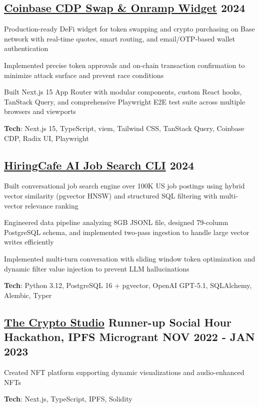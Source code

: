 \documentclass[letter,10pt]{article}
\begin{document}
\subsection{{ \href{https://github.com/Suhel-Kap/coinbase-swap-widget}{Coinbase CDP Swap \& Onramp Widget} \hfill 2024}}
\begin{zitemize}
  \item Production-ready DeFi widget for token swapping and crypto purchasing on Base network with real-time quotes, smart routing, and email/OTP-based wallet authentication
  \item Implemented precise token approvals and on-chain transaction confirmation to minimize attack surface and prevent race conditions
  \item Built Next.js 15 App Router with modular components, custom React hooks, TanStack Query, and comprehensive Playwright E2E test suite across multiple browsers and viewports
  \item \textbf{Tech}: Next.js 15, TypeScript, viem, Tailwind CSS, TanStack Query, Coinbase CDP, Radix UI, Playwright
\end{zitemize}

\subsection{{ \href{https://github.com/Suhel-Kap/hiringcafe-dataset-job-search}{HiringCafe AI Job Search CLI} \hfill 2024}}
\begin{zitemize}
  \item Built conversational job search engine over 100K US job postings using hybrid vector similarity (pgvector HNSW) and structured SQL filtering with multi-vector relevance ranking
  \item Engineered data pipeline analyzing 8GB JSONL file, designed 79-column PostgreSQL schema, and implemented two-pass ingestion to handle large vector writes efficiently
  \item Implemented multi-turn conversation with sliding window token optimization and dynamic filter value injection to prevent LLM hallucinations
  \item \textbf{Tech}: Python 3.12, PostgreSQL 16 + pgvector, OpenAI GPT-5.1, SQLAlchemy, Alembic, Typer
\end{zitemize}

\subsection{{ \href{https://github.com/Suhel-Kap/the-crypto-studio}{The Crypto Studio} Runner-up Social Hour Hackathon, IPFS Microgrant \hfill NOV 2022 - JAN 2023}}
\begin{zitemize}
  \item Created NFT platform supporting dynamic visualizations and audio-enhanced NFTs
  \item \textbf{Tech}: Next.js, TypeScript, IPFS, Solidity
\end{zitemize}
\end{document}
